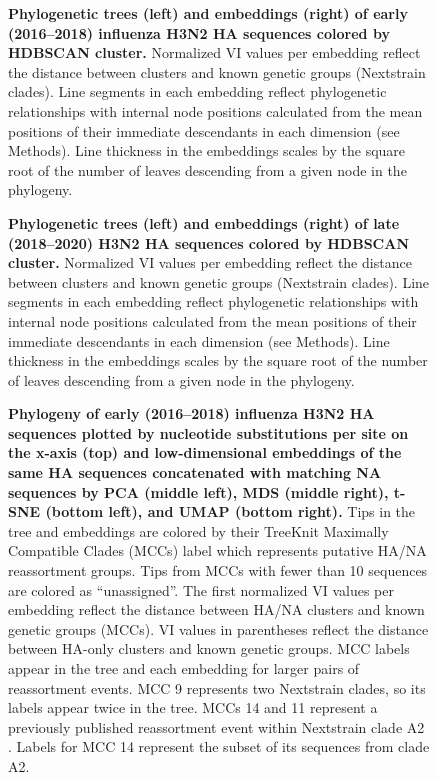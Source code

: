 \documentclass[webpdf,contemporary,large,single]{oup-authoring-template}%
\theoremstyle{thmstyleone}%
\theoremstyle{thmstyletwo}%
\theoremstyle{thmstylethree}%
\begin{document}
\begin{figure}[H]
\caption{{\bf Phylogenetic trees (left) and embeddings (right) of early (2016--2018) influenza H3N2 HA sequences colored by HDBSCAN cluster.}
  Normalized VI values per embedding reflect the distance between clusters and known genetic groups (Nextstrain clades).
  Line segments in each embedding reflect phylogenetic relationships with internal node positions calculated from the mean positions of their immediate descendants in each dimension (see Methods).
  Line thickness in the embeddings scales by the square root of the number of leaves descending from a given node in the phylogeny.}\label{fig:seasonal-influenza-h3n2-ha-2016-2018-clusters}
\end{figure}

\begin{figure}[H]
\caption{{\bf Phylogenetic trees (left) and embeddings (right) of late (2018--2020) H3N2 HA sequences colored by HDBSCAN cluster.}
  Normalized VI values per embedding reflect the distance between clusters and known genetic groups (Nextstrain clades).
  Line segments in each embedding reflect phylogenetic relationships with internal node positions calculated from the mean positions of their immediate descendants in each dimension (see Methods).
  Line thickness in the embeddings scales by the square root of the number of leaves descending from a given node in the phylogeny.}\label{fig:seasonal-influenza-h3n2-ha-2018-2020-clusters}
\end{figure}

\begin{figure}[H]
\caption{{\bf Phylogeny of early (2016--2018) influenza H3N2 HA sequences plotted by nucleotide substitutions per site on the x-axis (top) and low-dimensional embeddings of the same HA sequences concatenated with matching NA sequences by PCA (middle left), MDS (middle right), t-SNE (bottom left), and UMAP (bottom right).}
  Tips in the tree and embeddings are colored by their TreeKnit Maximally Compatible Clades (MCCs) label which represents putative HA/NA reassortment groups.
  Tips from MCCs with fewer than 10 sequences are colored as ``unassigned''.
  The first normalized VI values per embedding reflect the distance between HA/NA clusters and known genetic groups (MCCs).
  VI values in parentheses reflect the distance between HA-only clusters and known genetic groups.
  MCC labels appear in the tree and each embedding for larger pairs of reassortment events.
  MCC 9 represents two Nextstrain clades, so its labels appear twice in the tree.
  MCCs 14 and 11 represent a previously published reassortment event within Nextstrain clade A2 \citep{Potter2019}.
  Labels for MCC 14 represent the subset of its sequences from clade A2.
}\label{fig:seasonal-influenza-h3n2-ha-na-2016-2018-embeddings}
\end{figure}
\end{document}
